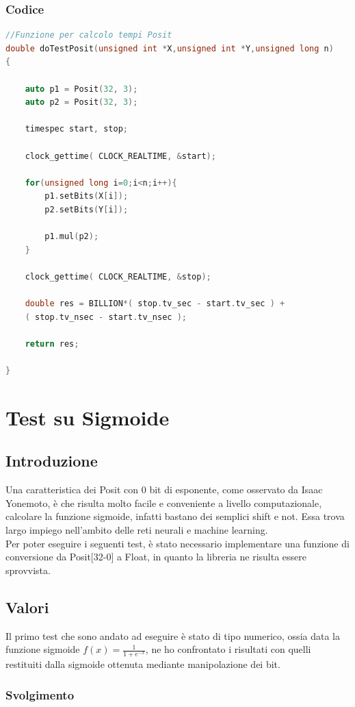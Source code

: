 \documentclass[a4paper,11pt]{article}
\begin{document}
\subsubsection{Codice}
\begin{lstlisting}[language=C++]
//Funzione per calcolo tempi Posit
double doTestPosit(unsigned int *X,unsigned int *Y,unsigned long n)
{

	auto p1 = Posit(32, 3);
	auto p2 = Posit(32, 3);    
	
	timespec start, stop;
	
	clock_gettime( CLOCK_REALTIME, &start);
	
	for(unsigned long i=0;i<n;i++){
		p1.setBits(X[i]);
		p2.setBits(Y[i]);
	
		p1.mul(p2);
	}
	
	clock_gettime( CLOCK_REALTIME, &stop);
	
	double res = BILLION*( stop.tv_sec - start.tv_sec ) + 
	( stop.tv_nsec - start.tv_nsec );
	
	return res;

}


\end{lstlisting}
\newpage
\section{Test su Sigmoide}
\subsection{Introduzione}
Una caratteristica dei Posit con 0 bit di esponente, come osservato da Isaac Yonemoto, è che risulta molto facile e conveniente a livello computazionale, calcolare la funzione sigmoide, infatti bastano dei semplici shift e not. Essa trova largo impiego nell'ambito delle reti neurali e machine learning.
\\Per poter eseguire i seguenti test, è stato necessario implementare una funzione di conversione da Posit[32-0] a Float, in quanto la libreria ne risulta essere sprovvista.

\subsection{Valori}
Il primo test che sono andato ad eseguire è stato di tipo numerico, ossia data la funzione sigmoide  $ f(x) = \frac {1}{1 + e^{-x}} $, ne ho confrontato i risultati con quelli restituiti dalla sigmoide ottenuta mediante manipolazione dei bit.

\subsubsection{Svolgimento}
\end{document}
